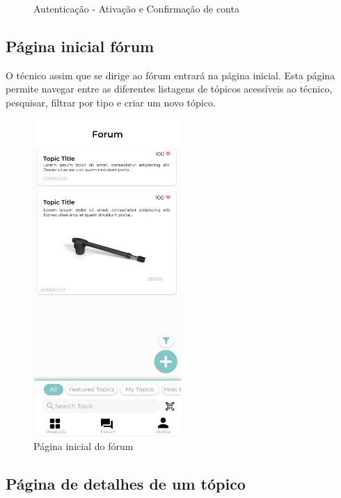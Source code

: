 \begin{figure}[htb]
    \caption{Autenticação - Ativação e Confirmação de conta}%
    \label{fig:25}%
\end{figure}

\newpage

\subsection{Página inicial fórum}

O técnico assim que se dirige ao fórum entrará na página inicial. Esta página permite navegar entre as diferentes listagens de tópicos acessíveis ao técnico, pesquisar, filtrar por tipo e criar um novo tópico.

\begin{figure}[htb]
    \centering
    \includegraphics[width=0.5\textwidth]{images/mockups/forum_home.png}
    \caption{Página inicial do fórum}
    \label{fig:26}
\end{figure}

\newpage

\subsection{Página de detalhes de um tópico}

